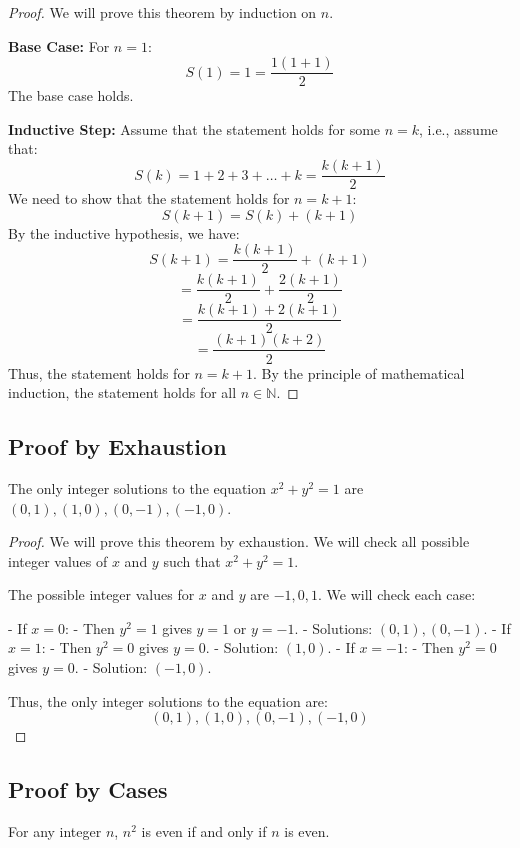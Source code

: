\begin{proof}
    We will prove this theorem by induction on \( n \).

    \textbf{Base Case:} For \( n = 1 \):
    \[
    S(1) = 1 = \frac{1(1+1)}{2}
    \]
    The base case holds.

    \textbf{Inductive Step:} Assume that the statement holds for some \( n = k \), i.e., assume that:
    \[
    S(k) = 1 + 2 + 3 + \ldots + k = \frac{k(k+1)}{2}
    \]
    We need to show that the statement holds for \( n = k + 1 \):
    \[
    S(k+1) = S(k) + (k + 1)
    \]
    By the inductive hypothesis, we have:
    \[
    S(k+1) = \frac{k(k+1)}{2} + (k + 1)
    \]
    \[    
    = \frac{k(k+1)}{2} + \frac{2(k + 1)}{2}
    \]
    \[      = \frac{k(k+1) + 2(k + 1)}{2}
    \]
    \[
    = \frac{(k + 1)(k + 2)}{2}
    \]
    Thus, the statement holds for \( n = k + 1 \).
    By the principle of mathematical induction, the statement holds for all \( n \in \mathbb{N} \).
\end{proof}
\subsection{Proof by Exhaustion}

    The only integer solutions to the equation \( x^2 + y^2 = 1 \) are \( (0, 1), (1, 0), (0, -1), (-1, 0) \).     
 
\begin{proof}
    We will prove this theorem by exhaustion. We will check all possible integer values of \( x \) and \( y \) such that \( x^2 + y^2 = 1 \).

    The possible integer values for \( x \) and \( y \) are \( -1, 0, 1 \). We will check each case:

    - If \( x = 0 \):
        - Then \( y^2 = 1 \) gives \( y = 1 \) or \( y = -1 \).
        - Solutions: \( (0, 1), (0, -1) \).
    - If \( x = 1 \):
        - Then \( y^2 = 0 \) gives \( y = 0 \).
        - Solution: \( (1, 0) \).
    - If \( x = -1 \):
        - Then \( y^2 = 0 \) gives \( y = 0 \).
        - Solution: \( (-1, 0) \).

    Thus, the only integer solutions to the equation are:
    \[
    (0, 1), (1, 0), (0, -1), (-1, 0)
    \]
\end{proof}
\subsection{Proof by Cases}

    For any integer \( n \), \( n^2 \) is even if and only if \( n \) is even.
  
